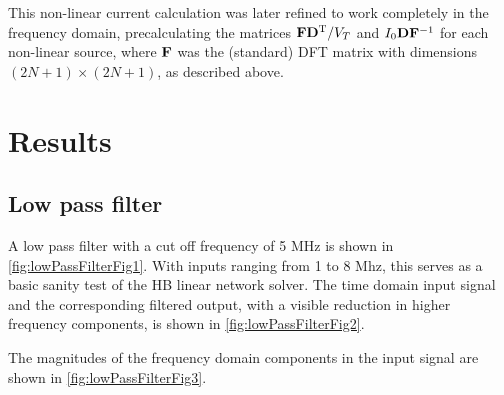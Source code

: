 This non-linear current calculation was later refined to work completely in the frequency domain, precalculating the matrices \( \mathbf{F} \mathbf{D}^{\text{T}}/V_T \) and \( I_0 \mathbf{D} \mathbf{F}^{-1} \) for each non-linear source, where \( \mathbf{F} \) was the (standard) DFT matrix with dimensions \( (2 N + 1 ) \times (2 N + 1 ) \), as described above.

\section{Results}

\subsection{Low pass filter}



A low pass filter with a cut off frequency of 5 MHz is shown in
\cref{fig:lowPassFilterFig1}.
With
inputs
ranging from 1 to 8 Mhz, this serves as a basic sanity test of the HB linear network solver.
The time domain input signal and the corresponding filtered output, with a visible reduction in higher frequency components,
is shown in \cref{fig:lowPassFilterFig2}.


The magnitudes of the frequency domain components in the input signal are shown in \cref{fig:lowPassFilterFig3}.


